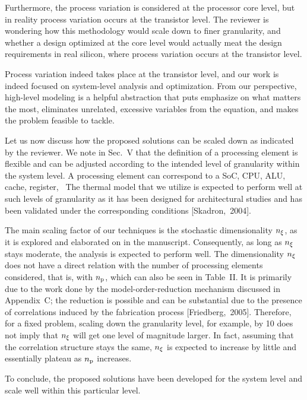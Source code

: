 \begin{reviewer}
Furthermore, the process variation is considered at the processor core level,
but in reality process variation occurs at the transistor level. The reviewer
is wondering how this methodology would scale down to finer granularity, and
whether a design optimized at the core level would actually meat the design
requirements in real silicon, where process variation occurs at the transistor
level.
\end{reviewer}

\begin{authors}
Process variation indeed takes place at the transistor level, and our work is
indeed focused on system-level analysis and optimization. From our perspective,
high-level modeling is a helpful abstraction that puts emphasize on what matters
the most, eliminates unrelated, excessive variables from the equation, and makes
the problem feasible to tackle.

Let us now discuss how the proposed solutions can be scaled down as indicated by
the reviewer. We note in Sec.~V that the definition of a processing element is
flexible and can be adjusted according to the intended level of granularity
within the system level. A processing element can correspond to a SoC, CPU, ALU,
cache, register, \etc\ The thermal model that we utilize is expected to perform
well at such levels of granularity as it has been designed for architectural
studies and has been validated under the corresponding conditions
[Skadron,~2004].

The main scaling factor of our techniques is the stochastic dimensionality
${n_\xi}$, as it is explored and elaborated on in the manuscript. Consequently,
as long as ${n_\xi}$ stays moderate, the analysis is expected to perform well.
The dimensionality ${n_\xi}$ does not have a direct relation with the number of
processing elements considered, that is, with ${n_\text{p}}$, which can also be seen in
Table~II. It is primarily due to the work done by the model-order-reduction
mechanism discussed in Appendix~C; the reduction is possible and can be
substantial due to the presence of correlations induced by the fabrication
process [Friedberg,~2005]. Therefore, for a fixed problem, scaling down the
granularity level, for example, by 10 does not imply that ${n_\xi}$ will get one
level of magnitude larger. In fact, assuming that the correlation structure
stays the same, ${n_\xi}$ is expected to increase by little and essentially
plateau as ${n_\text{p}}$ increases.

To conclude, the proposed solutions have been developed for the system level
and scale well within this particular level.

\begin{actions}
\end{actions}
\end{authors}

